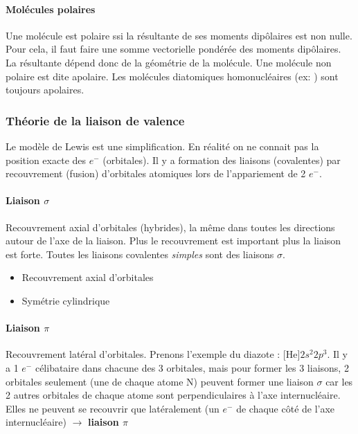 \documentclass[11pt,a4paper,french]{article}
\renewcommand{\textbf}[1]{\begingroup\bfseries\mathversion{bold}#1\endgroup}
\begin{document}
\paragraph{Molécules polaires}
Une molécule est polaire ssi la résultante de ses moments dipôlaires est non nulle.
Pour cela, il faut faire une somme vectorielle pondérée des moments dipôlaires.
La résultante dépend donc de la géométrie de la molécule.
Une molécule non polaire est dite apolaire.
Les molécules diatomiques homonucléaires (ex: ) sont toujours apolaires.

\subsubsection{Théorie de la liaison de valence}
Le modèle de Lewis est une simplification.
En réalité on ne connait pas la position exacte des $e^-$ (orbitales).
Il y a formation des liaisons (covalentes) par recouvrement (fusion) d'orbitales atomiques lors de l'appariement de 2 $e^-$.

\paragraph{Liaison $\sigma$}

Recouvrement axial d'orbitales (hybrides), la même dans toutes les directions autour de l'axe de la liaison.
Plus le recouvrement est important plus la liaison est forte.
Toutes les liaisons covalentes {\it simples} sont des liaisons $\sigma$.

\begin{itemize}
	\item Recouvrement axial d'orbitales
	\item Symétrie cylindrique
\end{itemize}

\paragraph{Liaison $\pi$}

Recouvrement latéral d'orbitales.
Prenons l'exemple du diazote : [He]$2s^2 2p^3$.
Il y a 1 $e^-$ célibataire dans chacune des 3 orbitales, mais pour former les 3 liaisons, 2 orbitales seulement (une de chaque atome N) peuvent former une liaison $\sigma$ car les 2 autres orbitales de chaque atome sont perpendiculaires à l'axe internucléaire.
Elles ne peuvent se recouvrir que latéralement (un $e^-$ de chaque côté de l'axe internucléaire) $\rightarrow$ \textbf{liaison $\pi$}
\end{document}

